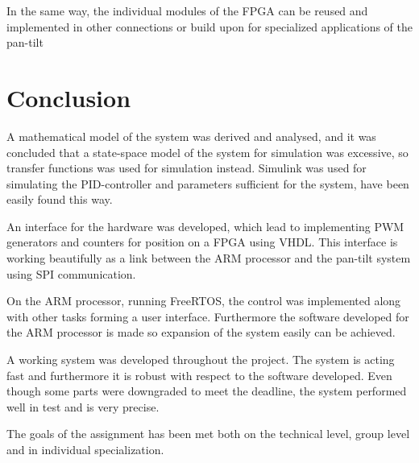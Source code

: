 In the same way, the individual modules of the FPGA can be reused and implemented in other connections or build upon for specialized applications of the pan-tilt



\chapter{Conclusion}\label{chap:conclusion}

A mathematical model of the system was derived and analysed, and it was concluded that a state-space model of the system for simulation was excessive, so transfer functions was used for simulation instead. Simulink was used for simulating the PID-controller and parameters sufficient for the system, have been easily found this way. 



An interface for the hardware was developed, which lead to implementing PWM generators and counters for position on a FPGA using VHDL. This interface is working beautifully as a link between the ARM processor and the pan-tilt system using SPI communication.



On the ARM processor, running FreeRTOS, the control was implemented along with other tasks forming a user interface. Furthermore the software developed for the ARM processor is made so expansion of the system easily can be achieved.



A working system was developed throughout the project. The system is acting fast and furthermore it is robust with respect to the software developed. Even though some parts were downgraded to meet the deadline, the system performed well in test and is very precise.



The goals of the assignment has been met both on the technical level, group level and in individual specialization.